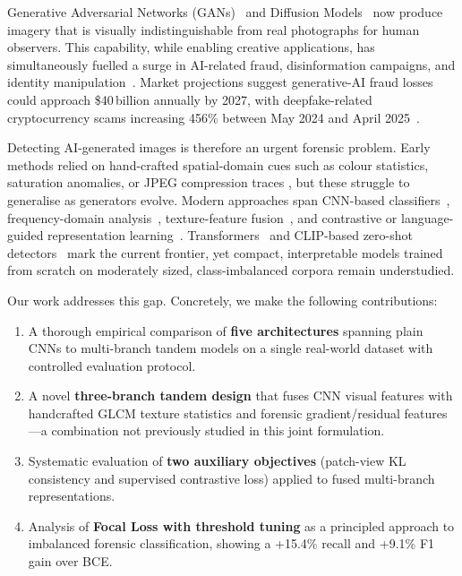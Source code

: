 \documentclass[10pt,twocolumn]{article}
\begin{document}
Generative Adversarial Networks (GANs)~\cite{goodfellow2014generative}
and Diffusion Models~\cite{rombach2022ldm} now produce imagery that is
visually indistinguishable from real photographs for human observers.
This capability, while enabling creative applications, has simultaneously
fuelled a surge in AI-related fraud, disinformation campaigns, and
identity manipulation~\cite{tasnim2025empirical}.
Market projections suggest generative-AI fraud losses could approach
\$40\,billion annually by 2027, with deepfake-related cryptocurrency
scams increasing 456\% between May 2024 and April
2025~\cite{tasnim2025empirical}.

Detecting AI-generated images is therefore an urgent forensic problem.
Early methods relied on hand-crafted spatial-domain cues such as colour
statistics, saturation anomalies, or JPEG compression traces
\cite{wang2020cnns}, but these struggle to generalise as generators evolve.
Modern approaches span CNN-based classifiers~\cite{wang2020cnns},
frequency-domain analysis~\cite{frank2020leveraging},
texture-feature fusion~\cite{liu2020gram,frontiers2025multimodal},
and contrastive or language-guided representation
learning~\cite{wu2023lasted,hong2024contrastive}.
Transformers~\cite{lamichhane2025vit} and CLIP-based
zero-shot detectors~\cite{ojha2023universal} mark the current frontier,
yet compact, interpretable models trained from scratch on moderately
sized, class-imbalanced corpora remain understudied.

Our work addresses this gap.
Concretely, we make the following contributions:
\begin{enumerate}[leftmargin=*, noitemsep]
  \item A thorough empirical comparison of \textbf{five architectures}
        spanning plain CNNs to multi-branch tandem models on a single
        real-world dataset with controlled evaluation protocol.
  \item A novel \textbf{three-branch tandem design} that fuses CNN visual
        features with handcrafted GLCM texture statistics and forensic
        gradient/residual features---a combination not previously studied
        in this joint formulation.
  \item Systematic evaluation of \textbf{two auxiliary objectives}
        (patch-view KL consistency and supervised contrastive loss)
        applied to fused multi-branch representations.
  \item Analysis of \textbf{Focal Loss with threshold tuning} as a
        principled approach to imbalanced forensic classification,
        showing a +15.4\% recall and +9.1\% F1 gain over BCE.
\end{enumerate}
\end{document}

